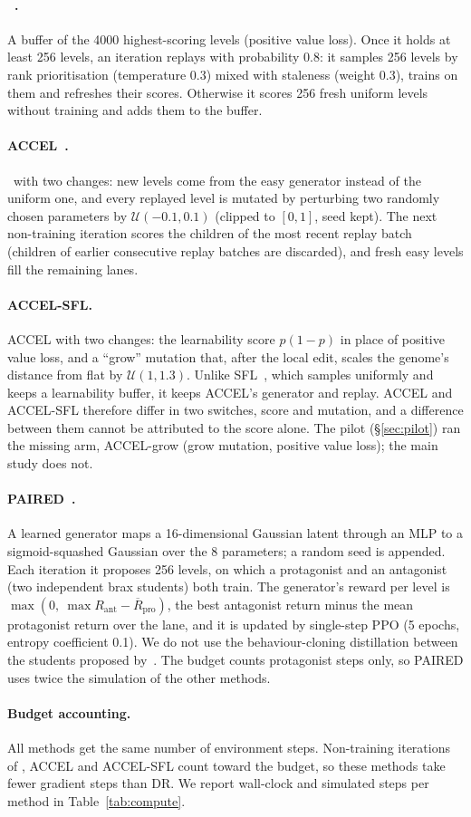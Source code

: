 \paragraph{\plr~\citep{jiang2021replay}.} A buffer of the 4000
highest-scoring levels (positive value loss). Once it holds at least 256
levels, an iteration replays with probability 0.8: it samples 256 levels by
rank prioritisation (temperature 0.3) mixed with staleness (weight 0.3),
trains on them and refreshes their scores. Otherwise it scores 256 fresh
uniform levels without training and adds them to the buffer.

\paragraph{ACCEL~\citep{parkerholder2022accel}.} \plr\ with two changes:
new levels come from the easy generator instead of the uniform one, and
every replayed level is mutated by perturbing two randomly chosen
parameters by $\mathcal{U}(-0.1,0.1)$ (clipped to $[0,1]$, seed kept). The
next non-training iteration scores the children of the most recent replay
batch (children of earlier consecutive replay batches are discarded), and
fresh easy levels fill the remaining lanes.

\paragraph{ACCEL-SFL.} ACCEL with two changes: the learnability score
$p(1-p)$ in place of positive value loss, and a ``grow'' mutation that,
after the local edit, scales the genome's distance from flat by
$\mathcal{U}(1,1.3)$. Unlike SFL~\citep{rutherford2024noregrets}, which
samples uniformly and keeps a learnability buffer, it keeps ACCEL's
generator and replay. ACCEL and ACCEL-SFL therefore differ in two
switches, score and mutation, and a difference between them cannot be
attributed to the score alone. The pilot (\S\ref{sec:pilot}) ran the
missing arm, ACCEL-grow (grow mutation, positive value loss); the main
study does not.

\paragraph{PAIRED~\citep{dennis2020paired}.} A learned generator maps a
16-dimensional Gaussian latent through an MLP to a sigmoid-squashed
Gaussian over the 8 parameters; a random seed is appended. Each iteration
it proposes 256 levels, on which a protagonist and an antagonist (two
independent brax students) both train. The generator's reward per level is
$\max(0,\ \max R_{\text{ant}} - \overline{R}_{\text{pro}})$, the best
antagonist return minus the mean protagonist return over the lane, and it
is updated by single-step PPO (5 epochs, entropy coefficient 0.1). We do
not use the behaviour-cloning distillation between the students
proposed by~\citet{mediratta2023stabilizing}. The budget
counts protagonist steps only, so PAIRED uses twice the simulation of the
other methods.

\paragraph{Budget accounting.}
All methods get the same number of environment steps. Non-training
iterations of \plr, ACCEL and ACCEL-SFL count toward the budget, so these
methods take fewer gradient steps than DR. We report wall-clock and
simulated steps per method in Table~\ref{tab:compute}.
